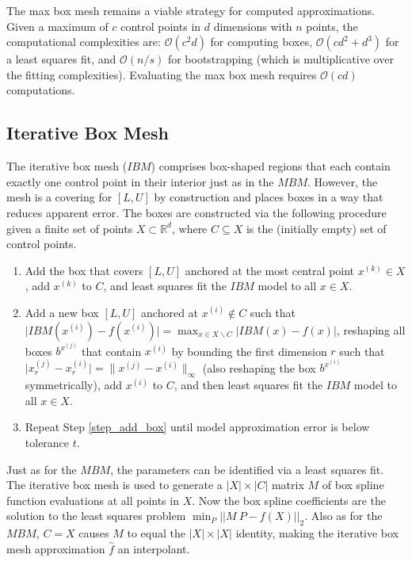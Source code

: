 The max box mesh remains a viable strategy for computed approximations. Given a maximum of $c$ control points in $d$ dimensions with $n$ points, the computational complexities are: $\mathcal{O}(c^2 d)$ for computing boxes, $\mathcal{O}(c d^2 + d^3)$ for a least squares fit, and $\mathcal{O}(n / s)$ for bootstrapping (which is multiplicative over the fitting complexities). Evaluating the max box mesh requires $\mathcal{O}(c d)$ computations.

\subsection{Iterative Box Mesh}

The iterative box mesh ($IBM$) comprises box-shaped regions that each contain exactly one control point in their interior just as in the $MBM$. However, the mesh is a covering for $[L,U]$ by construction and places boxes in a way that reduces apparent error. The boxes are constructed via the following procedure given a finite set of points $X \subset \mathbb{R}^d$, where $C \subseteq X$ is the (initially empty) set of control points.
\begin{enumerate}
\item Add the box that covers $[L,U]$ anchored at the most central point $x^{(k)} \in X$, add $x^{(k)}$ to $C$, and least squares fit the $IBM$ model to all $x \in X$.
\item Add a new box $[L,U]$ anchored at $x^{(i)} \notin C$ such that $\bigl| IBM(x^{(i)}) - f(x^{(i)}) \bigr| = \max_{x \in X \backslash C} \bigl| IBM(x) - f(x) \bigr|$, reshaping all boxes $b^{x^{(j)}}$ that contain $x^{(i)}$ by bounding the first dimension $r$ such that $\bigl| x^{(j)}_r - x^{(i)}_r \bigr| = \bigl\| x^{(j)} - x^{(i)} \bigr\|_\infty$ (also reshaping the box $b^{x^{(i)}}$ symmetrically), add $x^{(i)}$ to $C$, and then least squares fit the $IBM$ model to all $x \in X$. \label{step_add_box}
\item Repeat Step \ref{step_add_box} until model approximation error is below tolerance $t$.
\end{enumerate}

Just as for the $MBM$, the parameters can be identified via a least squares fit. The iterative box mesh is used to generate a $|X| \times |C|$ matrix $M$ of box spline function evaluations at all points in $X$. Now the box spline coefficients are the solution to the least squares problem $\min_P \bigl|\bigl| M\ P - f(X) \bigr|\bigr|_2$. Also as for the $MBM$, $C = X$ causes $M$ to equal the $|X| \times |X|$ identity, making the iterative box mesh approximation $\hat f$ an interpolant.

